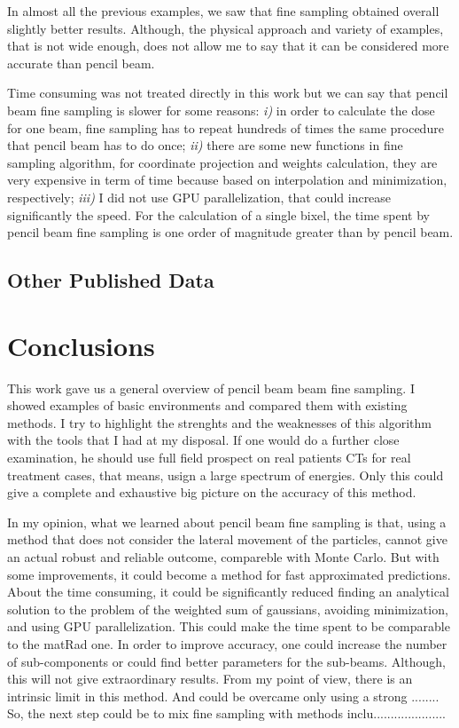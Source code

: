 \documentclass[12pt, a4paper, twoside]{book}
\begin{document}
In almost all the previous examples, we saw that fine sampling obtained overall slightly better results. Although, the physical approach and variety of examples, that is not wide enough, does not allow me to say that it can be considered more accurate than pencil beam. 

Time consuming was not treated directly in this work but we can say that pencil beam fine sampling is slower for some reasons: \emph{i)} in order to calculate the dose for one beam, fine sampling has to repeat hundreds of times the same procedure that pencil beam has to do once; \emph{ii)} there are some new functions in fine sampling algorithm, for coordinate projection and weights calculation, they are very expensive in term of time because based on interpolation and minimization, respectively; \emph{iii)} I did not use GPU parallelization, that could increase significantly the speed.
For the calculation of a single bixel, the time spent by pencil beam fine sampling is one order of magnitude greater than by pencil beam.


\section{Other Published Data}



\chapter{Conclusions} %
This work gave us a general overview of pencil beam beam fine sampling. I showed examples of basic environments and compared them with existing methods. I try to highlight the strenghts and the weaknesses of this algorithm with the tools that I had at my disposal. 
If one would do a further close examination, he should use full field prospect on real patients CTs for real treatment cases, that means, usign a large spectrum of energies. Only this could give a complete and exhaustive big picture on the accuracy of this method.

In my opinion, what we learned about pencil beam fine sampling is that, using a method that does not consider the lateral movement of the particles, cannot give an actual robust and reliable outcome, compareble with Monte Carlo. But with some improvements, it could become a method for fast approximated predictions.
About the time consuming, it could be significantly reduced finding an analytical solution to the problem of the weighted sum of gaussians, avoiding minimization, and using GPU parallelization. This could make the time spent to be comparable to the matRad one.
In order to improve accuracy, one could increase the number of sub-components or could find better parameters for the sub-beams. Although, this will not give extraordinary results.
From my point of view, there is an intrinsic limit in this method. And could be overcame only using a strong ........
So, the next step could be to mix fine sampling with methods inclu.....................
\end{document}
